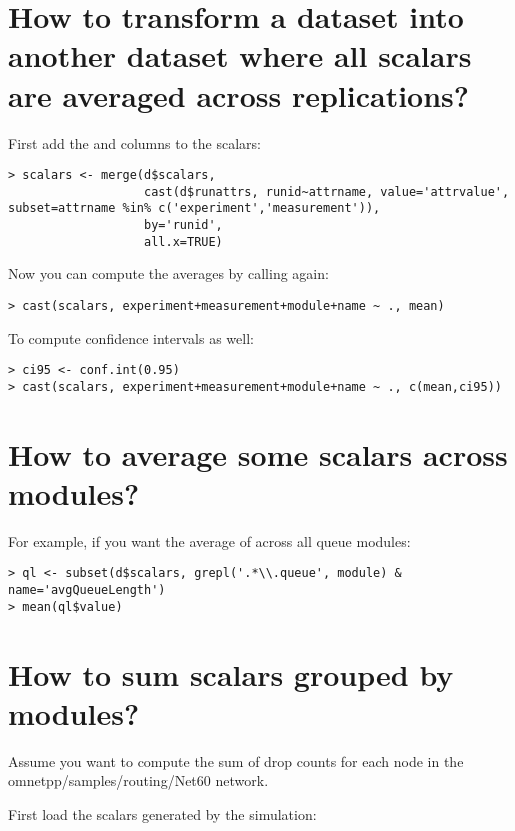 \section{How to transform a dataset into another dataset where all scalars are averaged across replications?}

First add the  and  columns to the scalars:

\begin{verbatim}
> scalars <- merge(d$scalars,
                   cast(d$runattrs, runid~attrname, value='attrvalue', subset=attrname %in% c('experiment','measurement')),
                   by='runid',
                   all.x=TRUE)
\end{verbatim}

Now you can compute the averages by calling  again:

\begin{verbatim}
> cast(scalars, experiment+measurement+module+name ~ ., mean)
\end{verbatim}

To compute confidence intervals as well:

\begin{verbatim}
> ci95 <- conf.int(0.95)
> cast(scalars, experiment+measurement+module+name ~ ., c(mean,ci95))
\end{verbatim}

\section{How to average some scalars across modules?}

For example, if you want the average of  across all queue modules:

\begin{verbatim}
> ql <- subset(d$scalars, grepl('.*\\.queue', module) & name='avgQueueLength')
> mean(ql$value)
\end{verbatim}

\section{How to sum scalars grouped by modules?}

Assume you want to compute the sum of drop counts for each node in the
omnetpp/samples/routing/Net60 network.

First load the scalars generated by the simulation:

